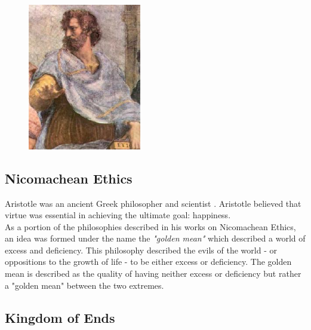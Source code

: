 \documentclass[11pt]{article}
\begin{document}
\begin{figure}
    \centering
    \includegraphics[width=0.44\textwidth]{aristotle.jpg}
\end{figure}

\subsection{Nicomachean Ethics}

Aristotle was an ancient Greek philosopher and scientist \cite{aristotle}. 
Aristotle believed that virtue was essential in achieving the ultimate goal: happiness.\\ 
\noindent As a portion of the philosophies described in his works on Nicomachean Ethics, an idea was formed under the name the \textit{"golden mean"} which described a world of excess and deficiency.
This philosophy described the evils of the world - or oppositions to the growth of life - to be either excess or deficiency. 
The golden mean is described as the quality of having neither excess or deficiency but rather a "golden mean" between the two extremes. 

\pagebreak
\subsection{Kingdom of Ends}
\end{document}
